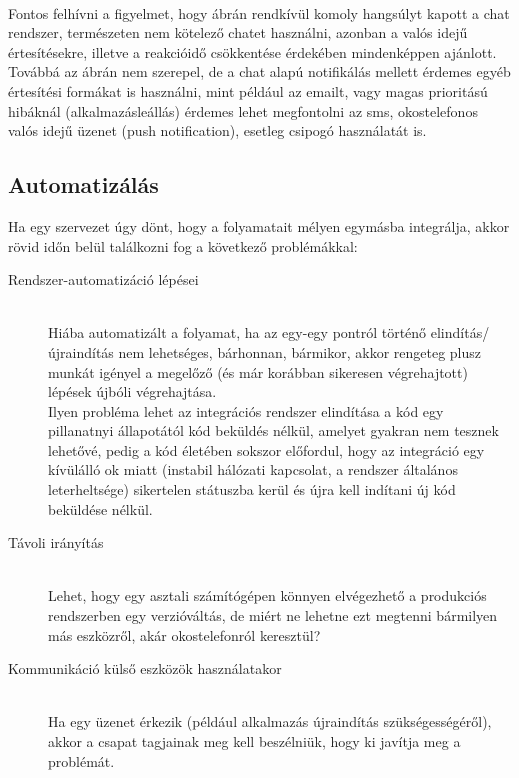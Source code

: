 \hfill\\
Fontos felhívni a figyelmet, hogy  ábrán rendkívül komoly hangsúlyt kapott a chat rendszer, természeten nem kötelező chatet használni, azonban a valós idejű értesítésekre, illetve a reakcióidő csökkentése érdekében mindenképpen ajánlott. Továbbá az ábrán nem szerepel, de a chat alapú notifikálás mellett érdemes egyéb értesítési formákat is használni, mint például az emailt, vagy magas prioritású hibáknál (alkalmazásleállás) érdemes lehet megfontolni az sms, okostelefonos valós idejű üzenet (push notification), esetleg csipogó használatát is.

\subsection{Automatizálás}
\label{subsec:automating}
Ha egy szervezet úgy dönt, hogy a folyamatait mélyen egymásba integrálja, akkor rövid időn belül találkozni fog a következő problémákkal:
\begin{description}
\item[Rendszer-automatizáció lépései]\hfill\\
Hiába automatizált a folyamat, ha az egy-egy pontról történő elindítás/újraindítás nem lehetséges, bárhonnan, bármikor, akkor rengeteg plusz munkát igényel a megelőző (és már korábban sikeresen végrehajtott) lépések újbóli végrehajtása.\\
Ilyen probléma lehet az integrációs rendszer elindítása a kód egy pillanatnyi állapotától kód beküldés nélkül, amelyet gyakran nem tesznek lehetővé, pedig a kód életében sokszor előfordul, hogy az integráció egy kívülálló ok miatt (instabil hálózati kapcsolat, a rendszer általános leterheltsége) sikertelen státuszba kerül és újra kell indítani új kód beküldése nélkül.

\item[Távoli irányítás]\hfill\\
Lehet, hogy egy asztali számítógépen könnyen elvégezhető a produkciós rendszerben egy verzióváltás, de miért ne lehetne ezt megtenni bármilyen más eszközről, akár okostelefonról keresztül?

\item[Kommunikáció külső eszközök használatakor]\hfill\\
Ha egy üzenet érkezik (például alkalmazás újraindítás szükségességéről), akkor a csapat tagjainak meg kell beszélniük, hogy ki javítja meg a problémát.
\end{description}

